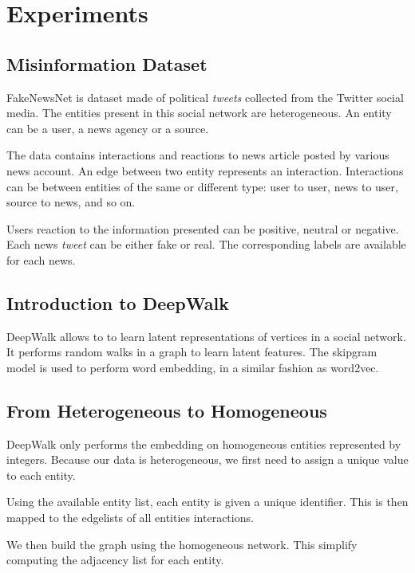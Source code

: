 
\chapter{Experiments} %
\label{cha:Experiments}

\section{Misinformation Dataset}

FakeNewsNet is dataset made of political \textit{tweets} collected from the Twitter social media.
The entities present in this social network are heterogeneous. 
An entity can be a user, a news agency or a source.

The data contains interactions and reactions to news article posted by various news account.
An edge between two entity represents an interaction.
Interactions can be between entities of the same or different type: user to user, news to user, source to news, and so on.

Users reaction to the information presented can be positive, neutral or negative.
Each news \textit{tweet} can be either fake or real. 
The corresponding labels are available for each news.

\section{Introduction to DeepWalk}

DeepWalk allows to to learn latent representations of vertices in a social network.
It performs random walks in a graph to learn latent features.
The skipgram model is used to perform word embedding, in a similar fashion as word2vec.

\section{From Heterogeneous to Homogeneous}

DeepWalk only performs the embedding on homogeneous entities represented by integers.
Because our data is heterogeneous, we first need to assign a unique value to each entity.

Using the available entity list, each entity is given a unique identifier.
This is then mapped to the edgelists of all entities interactions.

We then build the graph using the homogeneous network. 
This simplify computing the adjacency list for each entity.

